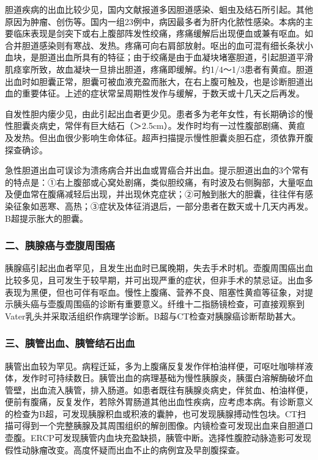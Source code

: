 胆道疾病的出血比较少见，国内文献报道多因胆道感染、蛔虫及结石所引起。其他原因为肿瘤、创伤等。国内一组23例中，病因最多者为肝内化脓性感染。本病的主要临床表现是剑突下或右上腹部阵发性绞痛，疼痛缓解后出现便血或兼有呕血。如合并胆道感染则有寒战、发热。疼痛可向右肩部放射。呕出的血可混有细长条状小血块，是胆道出血所具有的特征；由于绞痛是由于血凝块堵塞胆道，引起胆道平滑肌痉挛所致，故血凝块一旦排出胆道，疼痛即缓解。约1/4～1/3患者有黄疸。胆道出血时如胆囊正常，胆囊可被血液充盈而胀大，在右上腹可触及，也是诊断胆道出血的重要体征。上述的症状常呈周期性发作与缓解，于数天或十几天之后再发。

自发性胆内瘘少见，由此引起出血者更少见。患者多为老年女性，有长期确诊的慢性胆囊炎病史，常伴有巨大结石（＞2.5cm）。发作时均有一过性腹部剧痛、黄疸及发热。但出血很少影响生命体征。超声扫描提示慢性胆囊炎胆石症，须依靠开腹探查确诊。

急性胆道出血可误诊为溃疡病合并出血或胃癌合并出血。提示胆道出血的3个常有的特点是：①右上腹部或心窝处剧痛，类似胆绞痛，有时波及右侧胸部，大量呕血及便血常在腹痛减轻后出现，并出现休克症状；②可触到胀大的胆囊，往往伴有感染征象如恶寒、高热；③症状及体征消退后，一部分患者在数天或十几天内再发。B超提示胀大的胆囊。

\subsubsection{二、胰腺癌与壶腹周围癌}

胰腺癌引起出血者罕见，且发生出血时已属晚期，失去手术时机。壶腹周围癌出血比较多见，且可发生于较早期，并可出现严重的症状，但非手术的禁忌证。出血多表现为黑便，但也可伴有呕血。慢性上腹痛、营养不良、阻塞性黄疸等征象，对提示胰头癌与壶腹周围癌的诊断有重要意义。纤维十二指肠镜检查，可直接观察到Vater乳头并采取活组织作病理学诊断。B超与CT检查对胰腺癌诊断帮助甚大。

\subsubsection{三、胰管出血、胰管结石出血}

胰管出血较为罕见。病程迁延，多为上腹痛反复发作伴柏油样便，可呕吐咖啡样液体，发作时可持续数日。胰管出血的病理基础为慢性胰腺炎，胰蛋白溶解酶破坏血管壁，出血流入胰管，排入肠道。如患者既往有胰腺炎病史，伴贫血、柏油样便，便前有腹痛，反复发作，若除外胃肠道其他出血性疾病，应考虑本病。有诊断意义的检查为B超，可发现胰腺积血或积液的囊肿，也可发现胰腺搏动性包块。CT扫描可得到一个完整胰腺及其周围组织的解剖图像。内镜检查可发现出血来自胆道口壶腹。ERCP可发现胰管内血块充盈缺损，胰管中断。选择性腹腔动脉造影可发现假性动脉瘤改变。高度怀疑而出血不止的病例宜及早剖腹探查。

